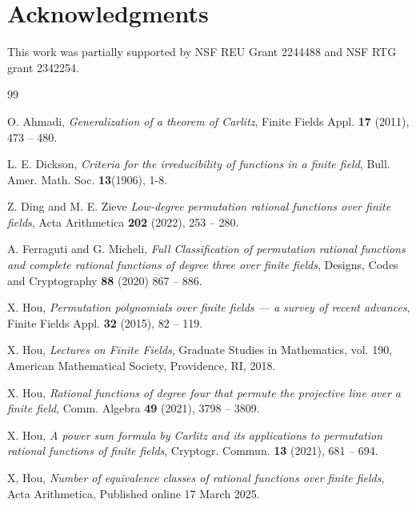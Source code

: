 \documentclass{amsart}
\numberwithin{equation}{section}
\theoremstyle{definition}
\begin{document}

\section*{Acknowledgments}

This work was partially supported by NSF REU Grant 2244488 and NSF RTG grant 2342254.


\begin{thebibliography}{99}

O. Ahmadi, {\it Generalization of a theorem of Carlitz}, Finite Fields Appl. {\bf 17} (2011), 473 -- 480.

L. E. Dickson, {\it Criteria for the irreducibility of functions in a finite field},
Bull. Amer. Math. Soc. {\bf 13}(1906), 1-8.

Z. Ding and M. E. Zieve {\it Low-degree permutation rational functions over finite fields}, Acta Arithmetica {\bf 202} (2022), 253 -- 280. %


A. Ferraguti and G. Micheli, {\it Full Classification of permutation rational functions and complete rational functions of degree three over finite fields},
Designs, Codes and Cryptography {\bf 88} (2020)  867 -- 886.

 X. Hou, {\it Permutation polynomials over finite fields --- a survey of recent advances}, Finite Fields Appl. {\bf 32} (2015), 82 -- 119.

X. Hou, {\it Lectures on Finite Fields}, Graduate Studies in Mathematics, vol. 190, American Mathematical Society, Providence, RI, 2018.


X. Hou, {\it Rational functions of degree four that permute the projective line over a finite field}, Comm. Algebra {\bf 49} (2021), 3798 -- 3809.

X. Hou, {\it A power sum formula by Carlitz and its applications to permutation rational functions of finite fields}, Cryptogr. Commun. {\bf 13} (2021), 681 -- 694. 

X, Hou, {\it Number of equivalence classes of rational functions over finite fields}, Acta Arithmetica, Published online 17 March 2025. %


\end{thebibliography}
\end{document}
